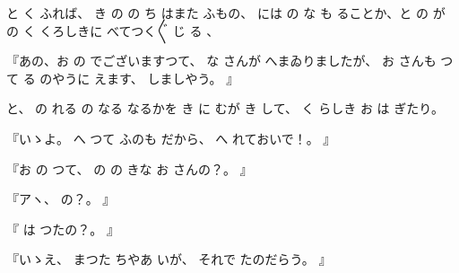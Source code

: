 と
く
ふれば、
き
の
の
ち
はまた
ふもの、
には
の
な
も
ることか、と
の
が
の
く
くろしきに
べてつく〴〵
じ
る
、

『あの、お
の
でございますつて、
な
さんが
へまゐりましたが、
お
さんも
つて
る
のやうに
えます、
しましやう。
』

と、
の
れる
の
なる
なるかを
き
に
むが
き
して、
く
らしき
お
は
ぎたり。

『いゝよ。
へ
つて
ふのも
だから、
へ
れておいで！。
』

『お
の
つて、
の
の
きな
お
さんの？。
』

『アヽ、
の？。
』

『
は
つたの？。
』

『いゝえ、
まつた
ちやあ
いが、
それで
たのだらう。
』

